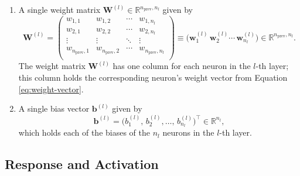 \documentclass[11pt, a4paper]{article}
\renewcommand{\vec}[1]{\bm{#1}}
\newcommand{\mat}[1]{\mathbf{#1}}
\newcommand{\W}{\mat{W}}
\newcommand{\w}{\vec{w}}
\renewcommand{\b}{\vec{b}}
\begin{document}
\begin{enumerate}

    \item A single weight matrix $ \W^{(l)} \in \mathbb{R}^{n_{\text{prev}}, n_{l}} $ given by
    \begin{equation}
        \W^{(l)} = 
        \begin{pmatrix}
            w_{1, 1} & w_{1, 2} & \cdots & w_{1, n_{l}}\\
            w_{2, 1} & w_{2, 2} & \cdots & w_{2, n_{l}}\\
            \vdots & \vdots & \ddots & \vdots\\
            w_{n_{\text{prev}}, 1} & w_{n_{\text{prev}}, 2} & \cdots & w_{n_{\text{prev}}, n_{l}}\\
        \end{pmatrix}
        \equiv \Big( \w_{1}^{(l)} \, \w_{2}^{(l)} \cdots \, \w_{n_{l}}^{(l)} \Big) \in \mathbb{R}^{n_{\text{prev}}, n_{l}}. \label{eq:weight-matrix}
    \end{equation}
    The weight matrix $ \W^{(l)} $ has one column for each neuron in the $ l $-th layer; this column holds the corresponding neuron's weight vector from Equation \ref{eq:weight-vector}.

    \item A single bias vector $ \b^{(l)} $ given by
    \begin{equation}
        \b^{(l)} = \Big( b_{1}^{(l)}, \, b_{2}^{(l)}, \ldots, \, b_{n_{l}}^{(l)} \Big)^{\top} \in \mathbb{R}^{n_{l}}, \label{eq:bias-vector}
    \end{equation}
    which holds each of the biases of the $ n_{l} $ neurons in the $ l $-th layer.


\end{enumerate}


\subsection{Response and Activation} \label{ss:response-activation}
\end{document}
